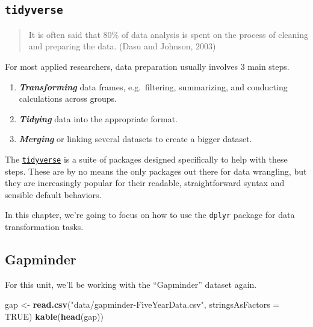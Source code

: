 \documentclass[]{book}
\newenvironment{Shaded}{\begin{snugshade}}{\end{snugshade}}
\newcommand{\KeywordTok}[1]{\textcolor[rgb]{0.13,0.29,0.53}{\textbf{#1}}}
\newcommand{\DataTypeTok}[1]{\textcolor[rgb]{0.13,0.29,0.53}{#1}}
\newcommand{\StringTok}[1]{\textcolor[rgb]{0.31,0.60,0.02}{#1}}
\newcommand{\OtherTok}[1]{\textcolor[rgb]{0.56,0.35,0.01}{#1}}
\newcommand{\NormalTok}[1]{#1}
\providecommand{\tightlist}{%
  \setlength{\itemsep}{0pt}\setlength{\parskip}{0pt}}
\begin{document}
\subsection{\texorpdfstring{\texttt{tidyverse}}{tidyverse}}\label{tidyverse}

\begin{quote}
It is often said that 80\% of data analysis is spent on the process of
cleaning and preparing the data. (Dasu and Johnson, 2003)
\end{quote}

For most applied researchers, data preparation usually involves 3 main
steps.

\begin{enumerate}
\def\labelenumi{\arabic{enumi}.}
\tightlist
\item
  \textbf{\emph{Transforming}} data frames, e.g.~filtering, summarizing,
  and conducting calculations across groups.
\item
  \textbf{\emph{Tidying}} data into the appropriate format.
\item
  \textbf{\emph{Merging}} or linking several datasets to create a bigger
  dataset.
\end{enumerate}

The \href{https://www.tidyverse.org/}{\texttt{tidyverse}} is a suite of
packages designed specifically to help with these steps. These are by no
means the only packages out there for data wrangling, but they are
increasingly popular for their readable, straightforward syntax and
sensible default behaviors.

In this chapter, we're going to focus on how to use the \texttt{dplyr}
package for data transformation tasks.

\subsection{Gapminder}\label{gapminder}

For this unit, we'll be working with the ``Gapminder'' dataset again.

\begin{Shaded}
\begin{Highlighting}[]
\NormalTok{gap <-}\StringTok{ }\KeywordTok{read.csv}\NormalTok{(}\StringTok{"data/gapminder-FiveYearData.csv"}\NormalTok{, }\DataTypeTok{stringsAsFactors =} \OtherTok{TRUE}\NormalTok{)}
\KeywordTok{kable}\NormalTok{(}\KeywordTok{head}\NormalTok{(gap))}
\end{Highlighting}
\end{Shaded}
\end{document}
